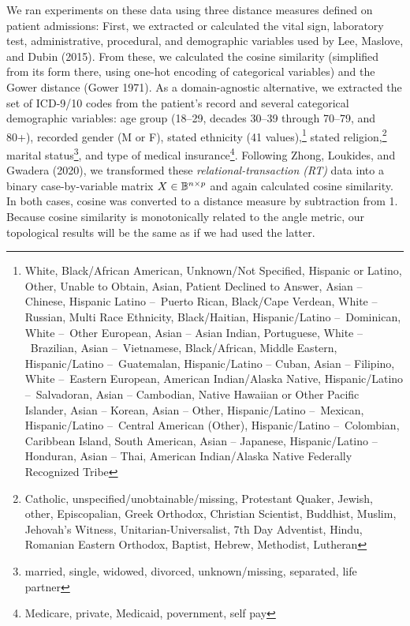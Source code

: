 \documentclass{article}
\begin{document}
We ran experiments on these data using three distance measures defined
on patient admissions: First, we extracted or calculated the vital sign,
laboratory test, administrative, procedural, and demographic variables
used by Lee, Maslove, and Dubin (2015). From these, we calculated the
cosine similarity (simplified from its form there, using one-hot
encoding of categorical variables) and the Gower distance (Gower 1971).
As a domain-agnostic alternative, we extracted the set of ICD-9/10 codes
from the patient's record and several categorical demographic variables:
age group (18--29, decades 30--39 through 70--79, and 80+), recorded
gender (M or F), stated ethnicity (41 values),\footnote{White,
  Black/African American, Unknown/Not Specified, Hispanic or Latino,
  Other, Unable to Obtain, Asian, Patient Declined to Answer, Asian --
  Chinese, Hispanic Latino --~Puerto Rican, Black/Cape Verdean, White --
  Russian, Multi Race Ethnicity, Black/Haitian, Hispanic/Latino
  --~Dominican, White --~Other European, Asian -- Asian Indian,
  Portuguese, White --~Brazilian, Asian --~Vietnamese, Black/African,
  Middle Eastern, Hispanic/Latino --~Guatemalan, Hispanic/Latino --
  Cuban, Asian -- Filipino, White --~Eastern European, American
  Indian/Alaska Native, Hispanic/Latino --~Salvadoran, Asian --
  Cambodian, Native Hawaiian or Other Pacific Islander, Asian -- Korean,
  Asian -- Other, Hispanic/Latino --~Mexican, Hispanic/Latino --~Central
  American (Other), Hispanic/Latino --~Colombian, Caribbean Island,
  South American, Asian -- Japanese, Hispanic/Latino -- Honduran, Asian
  -- Thai, American Indian/Alaska Native Federally Recognized Tribe}
stated religion,\footnote{Catholic, unspecified/unobtainable/missing,
  Protestant Quaker, Jewish, other, Episcopalian, Greek Orthodox,
  Christian Scientist, Buddhist, Muslim, Jehovah's Witness,
  Unitarian-Universalist, 7th Day Adventist, Hindu, Romanian Eastern
  Orthodox, Baptist, Hebrew, Methodist, Lutheran} marital
status\footnote{married, single, widowed, divorced, unknown/missing,
  separated, life partner}, and type of medical insurance\footnote{Medicare,
  private, Medicaid, povernment, self pay}. Following Zhong, Loukides,
and Gwadera (2020), we transformed these \emph{relational-transaction
(RT)} data into a binary case-by-variable matrix
\(X \in \mathbb{B}^{n \times p}\) and again calculated cosine similarity. In
both cases, cosine was converted to a distance measure by subtraction
from 1. Because cosine similarity is monotonically related to the angle
metric, our topological results will be the same as if we had used the
latter.
\end{document}
